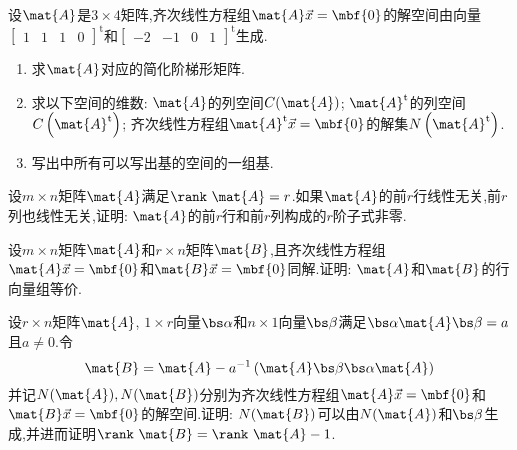 \documentclass{ctexart}
\begin{document}
\begin{homework}[4(20')]
    设$\mat{A}$是$3\times4$矩阵,齐次线性方程组$\mat{A}\vec{x}=\mbf{0}$的解空间由向量$\begin{bmatrix}
        1&1&1&0
    \end{bmatrix}^{\text{t}}$和$\begin{bmatrix}
        -2&-1&0&1
    \end{bmatrix}^{\text{t}}$生成.
    \begin{enumerate}[label=\tbf{(\arabic*)},topsep=0pt,parsep=0pt,itemsep=0pt,partopsep=0pt]
        \item 求$\mat{A}$对应的简化阶梯形矩阵.
        \item 求以下空间的维数:  $\mat{A}$的列空间$C(\mat{A})$;  $\mat{A}^{\text{t}}$的列空间$C\left(\mat{A}^{\text{t}}\right)$; 齐次线性方程组$\mat{A}^{\text{t}}\vec{x}=\mbf{0}$的解集$N\left(\mat{A}^{\text{t}}\right)$.
        \item 写出中所有可以写出基的空间的一组基.
    \end{enumerate}
\end{homework}
\begin{homework}[5(10')]
    设$m\times n$矩阵$\mat{A}$满足$\rank\ \mat{A}=r$.如果$\mat{A}$的前$r$行线性无关,前$r$列也线性无关,证明: $\mat{A}$的前$r$行和前$r$列构成的$r$阶子式非零.
\end{homework}
\begin{homework}[6(10')]
    设$m\times n$矩阵$\mat{A}$和$r\times n$矩阵$\mat{B}$,且齐次线性方程组$\mat{A}\vec{x}=\mbf{0}$和$\mat{B}\vec{x}=\mbf{0}$同解.证明: $\mat{A}$和$\mat{B}$的行向量组等价.
\end{homework}
\begin{homework}[7(12')]
    设$r\times n$矩阵$\mat{A}$, $1\times r$向量$\bs\alpha$和$n\times 1$向量$\bs\beta$满足$\bs\alpha\mat{A}\bs\beta=a$且$a\neq0$.令
    \[\mat{B}=\mat{A}-a^{-1}\left(\mat{A}\bs\beta\bs\alpha\mat{A}\right)\]
    并记$N(\mat{A}),N(\mat{B})$分别为齐次线性方程组$\mat{A}\vec{x}=\mbf{0}$和$\mat{B}\vec{x}=\mbf{0}$的解空间.证明: $N(\mat{B})$可以由$N(\mat{A})$和$\bs\beta$生成,并进而证明$\rank\ \mat{B}=\rank\ \mat{A}-1$.
\end{homework}
\end{document}
